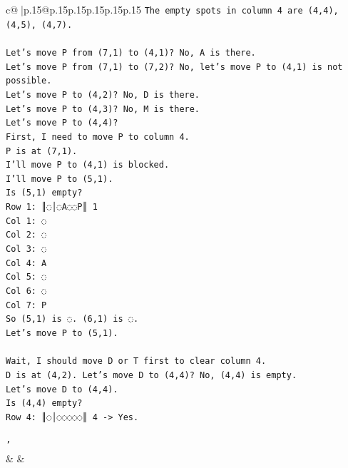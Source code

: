 \documentclass{article}
\begin{document}
{\begin{supertabular}{c@{$\;$}|p{.15\linewidth}@{}p{.15\linewidth}p{.15\linewidth}p{.15\linewidth}p{.15\linewidth}p{.15\linewidth}}
{{{\texttt{The empty spots in column 4 are (4,4), (4,5), (4,7).} \\
\\ 
\texttt{Let's move P from (7,1) to (4,1)? No, A is there.} \\
\texttt{Let's move P from (7,1) to (7,2)? No, let's move P to (4,1) is not possible.} \\
\texttt{Let's move P to (4,2)? No, D is there.} \\
\texttt{Let's move P to (4,3)? No, M is there.} \\
\texttt{Let's move P to (4,4)?} \\
\texttt{First, I need to move P to column 4.} \\
\texttt{P is at (7,1).} \\
\texttt{I'll move P to (4,1) is blocked.} \\
\texttt{I'll move P to (5,1).} \\
\texttt{Is (5,1) empty?} \\
\texttt{Row 1: ║◌│◌A◌◌P║ 1} \\
\texttt{Col 1: ◌} \\
\texttt{Col 2: ◌} \\
\texttt{Col 3: ◌} \\
\texttt{Col 4: A} \\
\texttt{Col 5: ◌} \\
\texttt{Col 6: ◌} \\
\texttt{Col 7: P} \\
\texttt{So (5,1) is ◌. (6,1) is ◌.} \\
\texttt{Let's move P to (5,1).} \\
\\ 
\texttt{Wait, I should move D or T first to clear column 4.} \\
\texttt{D is at (4,2). Let's move D to (4,4)? No, (4,4) is empty.} \\
\texttt{Let's move D to (4,4).} \\
\texttt{Is (4,4) empty?} \\
\texttt{Row 4: ║◌│◌◌◌◌◌║ 4 {-}> Yes.} \\
\\ 
\texttt{'} \\
            }
        }
    }
    & & \\ \\


\end{supertabular}}
\end{document}
